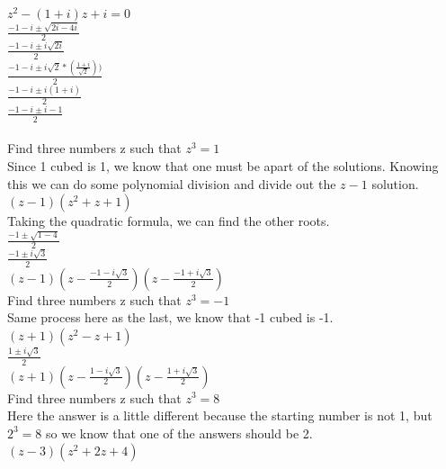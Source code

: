 \documentclass[12pt]{article}
\begin{document}
 $z^2 - (1 + i)z + i = 0$\\

$\frac{-1-i \pm \sqrt{2i - 4i}}{2}$\\
$\frac{-1-i \pm i\sqrt{2i}}{2}$\\
$\frac{-1-i \pm i\sqrt{2}*(\frac{1+i}{\sqrt{2}}))}{2}$\\
$\frac{-1-i \pm i(1+i)}{2}$\\
$\frac{-1-i \pm i-1}{2}$\\


\\

 Find three numbers z such that $z^3 = 1$\\

Since 1 cubed is 1, we know that one must be apart of the solutions.
Knowing this we can do some polynomial division and divide out the $z-1$ solution.\\
$(z-1)(z^2 + z + 1)$\\

Taking the quadratic formula, we can find the other roots.\\

$\frac{-1 \pm \sqrt{1-4}}{2}$\\
$\frac{-1 \pm i\sqrt{3}}{2}$\\

$(z-1)(z - \frac{-1 - i\sqrt{3}}{2})(z - \frac{-1 + i\sqrt{3}}{2})$\\


 Find three numbers z such that $z^3 = -1$\\

Same process here as the last, we know that -1 cubed is -1.\\

$(z+1)(z^2-z+1)$\\

$\frac{1 \pm i\sqrt{3}}{2}$\\

$(z+1)(z - \frac{1 - i\sqrt{3}}{2})(z - \frac{1 + i\sqrt{3}}{2})$\\

 Find three numbers z such that $z^3 = 8$\\

Here the answer is a little different because the starting number is not 1, but $2^3 = 8$ so we know that one of the answers should be 2.\\


$(z-3)(z^2+2z+4)$\\
\end{document}
